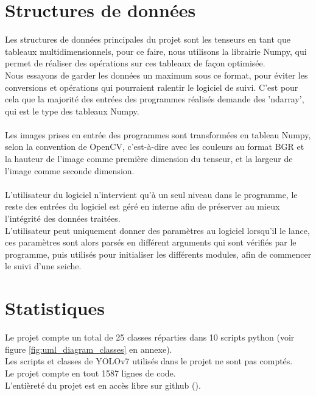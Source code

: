 \section{Structures de données}
Les structures de données principales du projet sont les tenseurs en tant que tableaux multidimensionnels, pour ce faire, nous utilisons la librairie Numpy, qui permet de réaliser des opérations sur ces tableaux de façon optimisée.\\
Nous essayons de garder les données un maximum sous ce format, pour éviter les conversions et opérations qui pourraient ralentir le logiciel de suivi. C'est pour cela que la majorité des entrées des programmes réalisés demande des 'ndarray', qui est le type des tableaux Numpy.\\
\\
Les images prises en entrée des programmes sont transformées en tableau Numpy, selon la convention de OpenCV, c'est-à-dire avec les couleurs au format BGR et la hauteur de l'image comme première dimension du tenseur, et la largeur de l'image comme seconde dimension.\\
\\
L'utilisateur du logiciel n'intervient qu'à un seul niveau dans le programme, le reste des entrées du logiciel est géré en interne afin de préserver au mieux l'intégrité des données traitées.\\
L'utilisateur peut uniquement donner des paramètres au logiciel lorsqu'il le lance, ces paramètres sont alors parsés en différent arguments qui sont vérifiés par le programme, puis utilisés pour initialiser les différents modules, afin de commencer le suivi d'une seiche.




\section{Statistiques}
Le projet compte un total de 25 classes réparties dans 10 scripts python (voir figure \ref{fig:uml_diagram_classes} en annexe).\\
Les scripts et classes de YOLOv7\cite{wang_yolov7_nodate} utilisés dans le projet ne sont pas comptés.\\
Le projet compte en tout 1587 lignes de code.\\
L'entièreté du projet est en accès libre sur github (\cite{pp2pf}).

\clearpage
